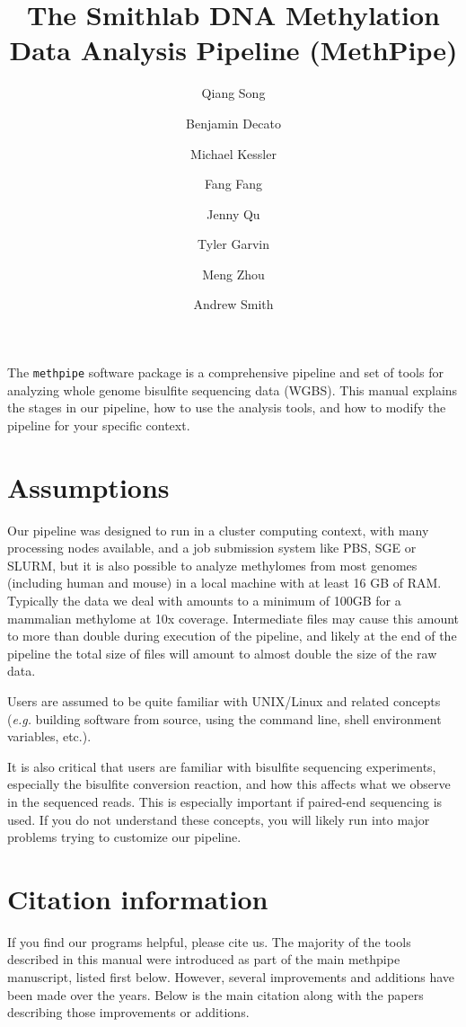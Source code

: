 \documentclass[10pt]{article}
\title{The Smithlab DNA Methylation Data Analysis Pipeline (MethPipe)}
\author{Qiang Song \and Benjamin Decato \and Michael Kessler \and Fang Fang
\and Jenny Qu \and Tyler Garvin \and Meng Zhou \and Andrew Smith}
\newcommand{\meth}{\texttt{methpipe}}
\begin{document}
\maketitle
\tableofcontents

\newpage

The \meth{} software package is a comprehensive pipeline and set of
tools for analyzing whole genome bisulfite sequencing data
(WGBS). This manual explains the stages in our pipeline, how to use
the analysis tools, and how to modify the pipeline for your specific
context.

\section{Assumptions}

Our pipeline was designed to run in a cluster computing context, with
many processing nodes available, and a job submission system like PBS,
SGE or SLURM, but it is also possible to analyze methylomes from most
genomes (including human and mouse) in a local machine with at least
16 GB of RAM. Typically the data we deal with amounts to a minimum of
100GB for a mammalian methylome at 10x coverage. Intermediate files
may cause this amount to more than double during execution of the
pipeline, and likely at the end of the pipeline the total size of
files will amount to almost double the size of the raw data.

Users are assumed to be quite familiar with UNIX/Linux and related
concepts ({\em e.g.} building software from source, using the command
line, shell environment variables, etc.).

It is also critical that users are familiar with bisulfite sequencing
experiments, especially the bisulfite conversion reaction, and how this
affects what we observe in the sequenced reads. This is especially important
if paired-end sequencing is used. If you do not understand these
concepts, you will likely run into major problems trying to customize our
pipeline.

\section{Citation information}

If you find our programs helpful, please cite us. The majority of the
tools described in this manual were introduced as part of the main
methpipe manuscript, listed first below. However, several improvements and
additions have been made over the years. Below is the main citation
along with the papers describing those improvements or additions.
\end{document}
